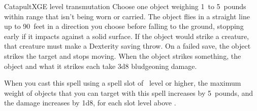 \begin{spell}{Catapult}{XGE}{ level transmutation}
{
}
Choose one object weighing 1~to 5~pounds within range
that isn't being worn or carried. The object flies in a
straight line up to 90~feet in a direction you choose
before falling to the ground, stopping early if it impacts
against a solid surface. If the object would strike a
creature, that creature must make a Dexterity saving throw.
On a failed save, the object strikes the target and stops
moving. When the object strikes something, the object
and what it strikes each take 3d8 bludgeoning damage.

 When you cast this spell using a
spell slot of ~level or higher, the maximum weight of
objects that you can target with this spell increases by
5~pounds, and the damage increases by 1d8, for each slot
level above .
\end{spell}